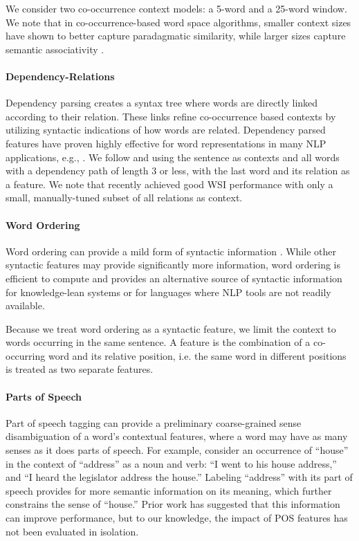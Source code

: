 \documentclass[11pt]{article}
\begin{document}
We consider two co-occurrence context models: a 5-word and a 25-word window.  We
note that in co-occurrence-based word space algorithms, smaller context sizes
have shown to better capture paradagmatic similarity, while larger sizes capture
semantic associativity \cite{peirsman08size,utsumi10exploring}.

\paragraph{Dependency-Relations}

Dependency parsing creates a syntax tree where words are directly linked
according to their relation.  These links refine co-occurrence based contexts by
utilizing syntactic indications of how words are related.  Dependency parsed
features have proven highly effective for word representations in many NLP
applications, e.g., \cite{pado07dependency,baroni10strudel}.  We follow
 and  using the
sentence as contexts and all words with a dependency path of length 3 or less,
with the last word and its relation as a feature.  We note that recently
 achieved good WSI performance with only a small,
manually-tuned subset of all relations as context.


\paragraph{Word Ordering}
Word ordering can provide a mild form of syntactic information
\cite{jones06high,sahlgren08permutations}.  While other syntactic features may
provide significantly more information, word ordering is efficient to compute
and provides an alternative source of syntactic information for knowledge-lean
systems or for languages where NLP tools are not readily available.  

Because we treat word ordering as a syntactic feature, we limit the context to
words occurring in the same sentence.  A feature is the combination of a
co-occurring word and its relative position, i.e. the same word in different
positions is treated as two separate features.

\paragraph{Parts of Speech}
Part of speech tagging can provide a preliminary coarse-grained sense
disambiguation of a word's contextual features, where a word may have as many
senses as it does parts of speech.   For example, consider an occurrence
of ``house'' in the context of ``address'' as a noun and verb: ``I went to his
house address,'' and ``I heard the legislator address the house.''
%
Labeling ``address'' with its part of speech provides for more semantic
information on its meaning, which further constrains the sense of ``house.''
%
Prior work \cite{pedersen97distinguishing} has suggested that this information
can improve performance, but to our knowledge, the impact of POS features has
not been evaluated in isolation.
\end{document}
